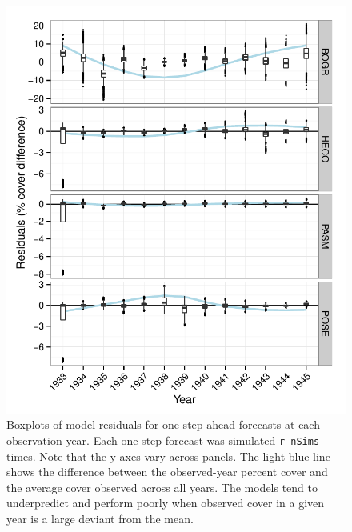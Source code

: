 \documentclass[author-year, 12pt,review]{components/elsarticle} %
\makeatletter
\def\maxwidth{\ifdim\Gin@nat@width>\linewidth\linewidth
\else\Gin@nat@width\fi}
\let\Oldincludegraphics\includegraphics
\renewcommand{\includegraphics}[1]{\Oldincludegraphics[width=\maxwidth]{#1}}
\makeatother
\begin{document}
\begin{figure}[htbp]
\centering
\includegraphics{components/figure/manuscript-figure_3.pdf}
\caption{Boxplots of model residuals for one-step-ahead forecasts at
each observation year. Each one-step forecast was simulated
\texttt{r nSims} times. Note that the y-axes vary across panels. The
light blue line shows the difference between the observed-year percent
cover and the average cover observed across all years. The models tend
to underpredict and perform poorly when observed cover in a given year
is a large deviant from the mean.}
\end{figure}
\end{document}
